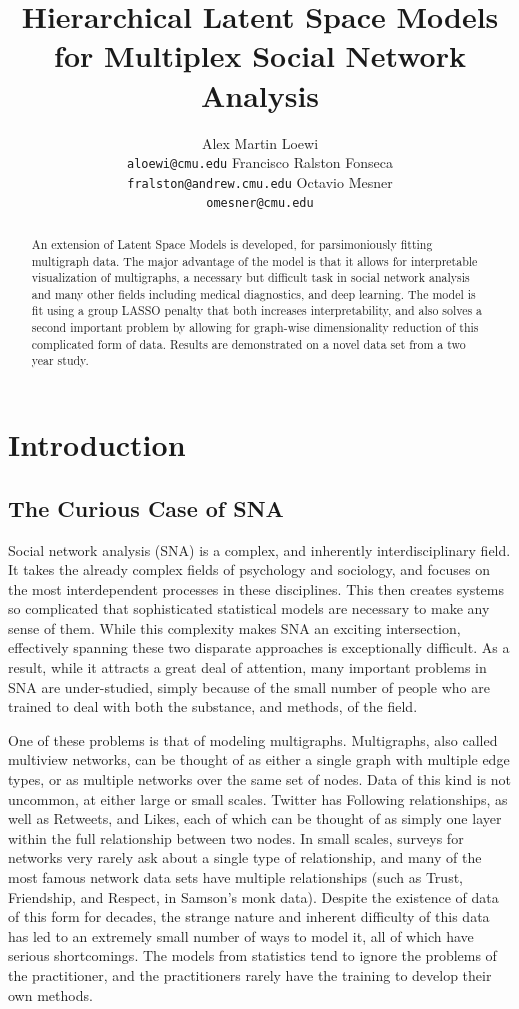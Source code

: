 \documentclass{article}
\title{Hierarchical Latent Space Models\\for Multiplex Social Network Analysis}
\author{
  Alex Martin Loewi \\
  \texttt{aloewi@cmu.edu}
  \And
  Francisco Ralston Fonseca\\
  \texttt{fralston@andrew.cmu.edu}
  \And
  Octavio Mesner\\
  \texttt{omesner@cmu.edu}
}
\begin{document}

\maketitle

\begin{abstract}
An extension of Latent Space Models is developed, for parsimoniously fitting multigraph data. The major advantage of the model is that it allows for interpretable visualization of multigraphs, a necessary but difficult task in social network analysis and many other fields including medical diagnostics, and deep learning. The model is fit using a group LASSO penalty that both increases interpretability, and also solves a second important problem by allowing for graph-wise dimensionality reduction of this complicated form of data. Results are demonstrated on a novel data set from a two year study.
\end{abstract}

\section{Introduction}

\subsection{The Curious Case of SNA}
Social network analysis (SNA) is a complex, and inherently interdisciplinary field. It takes the already complex fields of psychology and sociology, and focuses on the most interdependent processes in these disciplines. This then creates systems so complicated that sophisticated statistical models are necessary to make any sense of them. While this complexity makes SNA an exciting intersection, effectively spanning these two disparate approaches is exceptionally difficult. As a result, while it attracts a great deal of attention, many important problems in SNA are under-studied, simply because of the small number of people who are trained to deal with both the substance, and methods, of the field.

One of these problems is that of modeling multigraphs. Multigraphs, also called multiview networks, can be thought of as either a single graph with multiple edge types, or as multiple networks over the same set of nodes. Data of this kind is not uncommon, at either large or small scales. Twitter has Following relationships, as well as Retweets, and Likes, each of which can be thought of as simply one layer within the full relationship between two nodes. In small scales, surveys for networks very rarely ask about a single type of relationship, and many of the most famous network data sets have multiple relationships (such as Trust, Friendship, and Respect, in Samson's monk data). Despite the existence of data of this form for decades, the strange nature and inherent difficulty of this data has led to an extremely small number of ways to model it, all of which have serious shortcomings. The models from statistics tend to ignore the problems of the practitioner, and the practitioners rarely have the training to develop their own methods.
\end{document}
